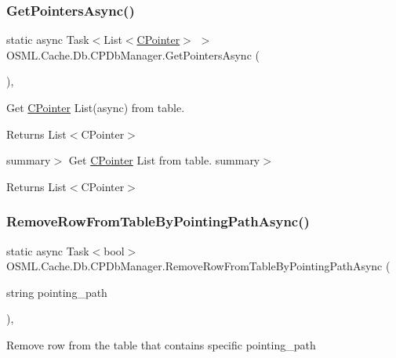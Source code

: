 \subsubsection{\texorpdfstring{GetPointersAsync()}{GetPointersAsync()}}
{\footnotesize\ttfamily static async Task$<$List$<$\mbox{\hyperlink{classOSML_1_1Cache_1_1CPointer}{C\+Pointer}}$>$ $>$ O\+S\+M\+L.\+Cache.\+Db.\+C\+P\+Db\+Manager.\+Get\+Pointers\+Async (\begin{DoxyParamCaption}{ }\end{DoxyParamCaption})\hspace{0.3cm}{\ttfamily [inline]}, {\ttfamily [static]}}



Get \mbox{\hyperlink{classOSML_1_1Cache_1_1CPointer}{C\+Pointer}} List(async) from table. 

\begin{DoxyReturn}{Returns}
List$<$\+C\+Pointer$>$ 
\end{DoxyReturn}
summary$>$ Get \mbox{\hyperlink{classOSML_1_1Cache_1_1CPointer}{C\+Pointer}} List from table. summary$>$ \begin{DoxyReturn}{Returns}
List$<$\+C\+Pointer$>$ 
\end{DoxyReturn}
\mbox{\label{classOSML_1_1Cache_1_1Db_1_1CPDbManager_a1b69a9baeb45ca4d745750a8b24c9587}} 
\subsubsection{\texorpdfstring{RemoveRowFromTableByPointingPathAsync()}{RemoveRowFromTableByPointingPathAsync()}}
{\footnotesize\ttfamily static async Task$<$bool$>$ O\+S\+M\+L.\+Cache.\+Db.\+C\+P\+Db\+Manager.\+Remove\+Row\+From\+Table\+By\+Pointing\+Path\+Async (\begin{DoxyParamCaption}\item[{string}]{pointing\+\_\+path }\end{DoxyParamCaption})\hspace{0.3cm}{\ttfamily [inline]}, {\ttfamily [static]}}



Remove row from the table that contains specific pointing\+\_\+path 

